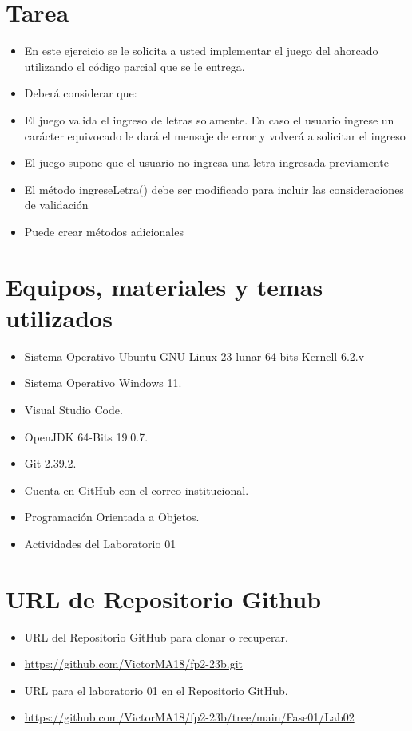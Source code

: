 \documentclass{article}
\begin{document}
	\section{Tarea}
	\begin{itemize}		
        \item En este ejercicio se le solicita a usted implementar el juego del ahorcado utilizando el código parcial que se le entrega.
        \item Deberá considerar que:
        \item El juego valida el ingreso de letras solamente. En caso el usuario ingrese un carácter equivocado le dará el mensaje de error y volverá a solicitar el ingreso
        \item El juego supone que el usuario no ingresa una letra ingresada previamente
        \item El método ingreseLetra() debe ser modificado para incluir las consideraciones de validación
        \item Puede crear métodos adicionales
	\end{itemize}
		
	\section{Equipos, materiales y temas utilizados}
	\begin{itemize}
		\item Sistema Operativo Ubuntu GNU Linux 23 lunar 64 bits Kernell 6.2.v
		\item Sistema Operativo Windows 11.
		\item Visual Studio Code.
		\item OpenJDK 64-Bits 19.0.7.
		\item Git 2.39.2.
		\item Cuenta en GitHub con el correo institucional.
		\item Programación Orientada a Objetos.
		\item Actividades del Laboratorio 01	
	\end{itemize}
	
	\section{URL de Repositorio Github}
	\begin{itemize}
		\item URL del Repositorio GitHub para clonar o recuperar.
		\item \url{https://github.com/VictorMA18/fp2-23b.git}
		\item URL para el laboratorio 01 en el Repositorio GitHub.
		\item \url{https://github.com/VictorMA18/fp2-23b/tree/main/Fase01/Lab02}
	\end{itemize}
	
\end{document}

